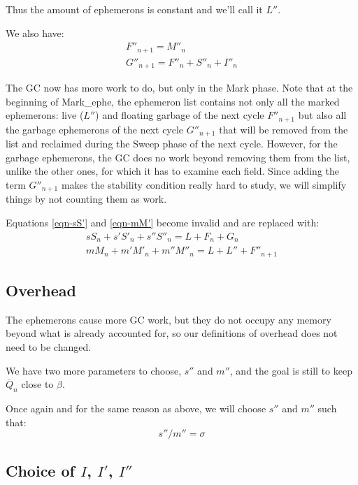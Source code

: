 \documentclass{article}
\begin{document}
Thus the amount of ephemerons is constant and we'll call it $L''$.

We also have:
\begin{gather}
F''_{n+1} = M''_n  \label{eqn-F''} \\
G''_{n+1} = F''_n + S''_n + I''_n   \label{eqn-G''}
\end{gather}

The GC now has more work to do, but only in the Mark phase. Note that
at the beginning of Mark\_ephe, the ephemeron list contains not only
all the marked ephemerons: live ($L''$) and floating garbage of the next
cycle $F''_{n+1}$ but also all the garbage ephemerons of the next
cycle $G''_{n+1}$ that will be removed from the list and reclaimed
during the Sweep phase of the next cycle. However, for the garbage
ephemerons, the GC does no work beyond removing them from the list,
unlike the other ones, for which it has to examine each field. Since
adding the term $G''_{n+1}$ makes the stability condition really hard
to study, we will simplify things by not counting them as work.

Equations
\eqref{eqn-sS'} and \eqref{eqn-mM'} become invalid and are replaced with:
\begin{gather}
sS_n + s'S'_n + s''S''_n = L + F_n + G_n \label{eqn-sS''}  \\
mM_n + m'M'_n + m''M''_n = L + L'' + F''_{n+1}  \label{eqn-mM''}
\end{gather}


\subsection{Overhead}

The ephemerons cause more GC work, but they do not occupy any memory
beyond what is already accounted for, so our definitions of overhead
does not need to be changed.

We have two more parameters to choose, $s''$ and $m''$, and the goal
is still to keep $\overline{Q}_n$ close to $\beta$.

Once again and for the same reason as above, we will choose $s''$ and
$m''$ such that:
\begin{equation}
s''/m'' = \sigma
\end{equation}


\subsection[Choice of I, I', I'']{Choice of $I$, $I'$, $I''$}
\end{document}
